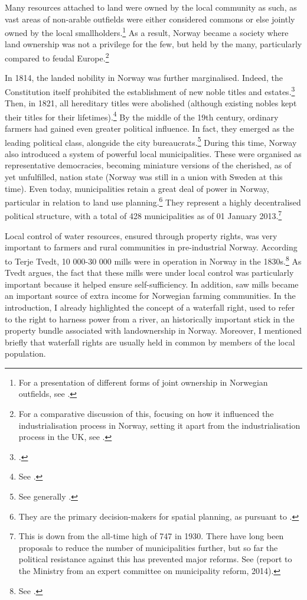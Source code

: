Many resources attached to land were owned by the local community as such, as vast areas of non-arable outfields were either considered commons or else jointly owned by the local smallholders.\footnote{For a presentation of different forms of joint ownership in Norwegian outfields, see \cite{stenseth07a}.} As a result, Norway became a society where land ownership was not a privilege for the few, but held by the many, particularly compared to feudal Europe.\footnote{For a comparative discussion of this, focusing on how it influenced the industrialisation process in Norway, setting it apart from the industrialisation process in the UK, see \cite{brox13}.}

In 1814, the landed nobility in Norway was further marginalised. Indeed, the Constitution itself prohibited the establishment of new noble titles and estates.\dni\footcite[23|118]{grunnloven14} Then, in 1821, all hereditary titles were abolished (although existing nobles kept their titles for their lifetimes).\footnote{See \cite{adel09}.} By the middle of the 19th century, ordinary farmers had gained even greater political influence. In fact, they emerged as the leading political class, alongside the city bureaucrats.\footnote{See generally \cite{hommerstad14}.} During this time, Norway also introduced a system of powerful local municipalities. These were organised as representative democracies, becoming miniature versions of the cherished, as of yet unfulfilled, nation state (Norway was still in a union with Sweden at this time). Even today, municipalities retain a great deal of power in Norway, particular in relation to land use planning.\footnote{They are the primary decision-makers for spatial planning, as pursuant to \cite{pb08}.} They represent a highly decentralised political structure, with a total of 428 municipalities as of 01 January 2013.\footnote{This is down from the all-time high of 747 in 1930. There have long been proposals to reduce the number of municipalities further, but so far the political resistance against this has prevented major reforms. See \cite{kommuner14} (report to the Ministry from an expert committee on municipality reform, 2014).}

Local control of water resources, ensured through property rights, was very important to farmers and rural communities in pre-industrial Norway. According to Terje Tvedt, 10 000-30 000 mills were in operation in Norway in the 1830s.\footnote{See \cite[121]{tvedt13}.} As Tvedt argues, the fact that these mills were under local control was particularly important because it helped ensure self-sufficiency. In addition, saw mills became an important source of extra income for Norwegian farming communities. In the introduction, I already highlighted the concept of a waterfall right, used to refer to the right to harness power from a river, an historically important stick in the property bundle associated with landownership in Norway. Moreover, I mentioned briefly that waterfall rights are usually held in common by members of the local population. 

